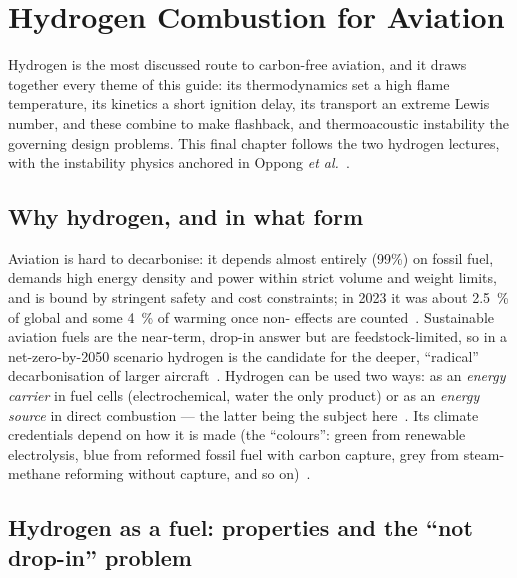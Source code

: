 \chapter{Hydrogen Combustion for Aviation}\label{ch:hydrogen}

Hydrogen is the most discussed route to carbon-free aviation, and it draws together every theme of this guide: its thermodynamics set a high flame temperature, its kinetics a short ignition delay, its transport an extreme Lewis number, and these combine to make flashback,  and thermoacoustic instability the governing design problems. This final chapter follows the two hydrogen lectures, with the instability physics anchored in Oppong \emph{et al.}~\cite{lecture14part1,lecture14,oppong2022instability}.

\section{Why hydrogen, and in what form}

Aviation is hard to decarbonise: it depends almost entirely (99\%) on fossil fuel, demands high energy density and power within strict volume and weight limits, and is bound by stringent safety and cost constraints; in 2023 it was about \SI{2.5}{\percent} of global  and some \SI{4}{\percent} of warming once non- effects are counted~\cite{lecture14part1}. Sustainable aviation fuels are the near-term, drop-in answer but are feedstock-limited, so in a net-zero-by-2050 scenario hydrogen is the candidate for the deeper, ``radical'' decarbonisation of larger aircraft~\cite{lecture14part1}. Hydrogen can be used two ways: as an \emph{energy carrier} in fuel cells (electrochemical, water the only product) or as an \emph{energy source} in direct combustion --- the latter being the subject here~\cite{lecture14part1}. Its climate credentials depend on how it is made (the ``colours'': green from renewable electrolysis, blue from reformed fossil fuel with carbon capture, grey from steam-methane reforming without capture, and so on)~\cite{lecture14part1}.

\section{Hydrogen as a fuel: properties and the ``not drop-in'' problem}

